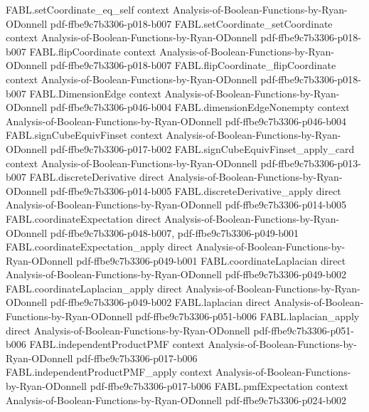 \begin{theorem}
  {FABL.setCoordinate_eq_self}
  {context}
  {Analysis-of-Boolean-Functions-by-Ryan-ODonnell}
  {pdf-ffbe9c7b3306-p018-b007}
\proofstep
  {FABL.setCoordinate_setCoordinate}
  {context}
  {Analysis-of-Boolean-Functions-by-Ryan-ODonnell}
  {pdf-ffbe9c7b3306-p018-b007}
\proofstep
  {FABL.flipCoordinate}
  {context}
  {Analysis-of-Boolean-Functions-by-Ryan-ODonnell}
  {pdf-ffbe9c7b3306-p018-b007}
\proofstep
  {FABL.flipCoordinate_flipCoordinate}
  {context}
  {Analysis-of-Boolean-Functions-by-Ryan-ODonnell}
  {pdf-ffbe9c7b3306-p018-b007}
\proofstep
  {FABL.DimensionEdge}
  {context}
  {Analysis-of-Boolean-Functions-by-Ryan-ODonnell}
  {pdf-ffbe9c7b3306-p046-b004}
\proofstep
  {FABL.dimensionEdgeNonempty}
  {context}
  {Analysis-of-Boolean-Functions-by-Ryan-ODonnell}
  {pdf-ffbe9c7b3306-p046-b004}
\proofstep
  {FABL.signCubeEquivFinset}
  {context}
  {Analysis-of-Boolean-Functions-by-Ryan-ODonnell}
  {pdf-ffbe9c7b3306-p017-b002}
\proofstep
  {FABL.signCubeEquivFinset_apply_card}
  {context}
  {Analysis-of-Boolean-Functions-by-Ryan-ODonnell}
  {pdf-ffbe9c7b3306-p013-b007}
\proofstep
  {FABL.discreteDerivative}
  {direct}
  {Analysis-of-Boolean-Functions-by-Ryan-ODonnell}
  {pdf-ffbe9c7b3306-p014-b005}
\proofstep
  {FABL.discreteDerivative_apply}
  {direct}
  {Analysis-of-Boolean-Functions-by-Ryan-ODonnell}
  {pdf-ffbe9c7b3306-p014-b005}
\proofstep
  {FABL.coordinateExpectation}
  {direct}
  {Analysis-of-Boolean-Functions-by-Ryan-ODonnell}
  {pdf-ffbe9c7b3306-p048-b007,
    pdf-ffbe9c7b3306-p049-b001}
\proofstep
  {FABL.coordinateExpectation_apply}
  {direct}
  {Analysis-of-Boolean-Functions-by-Ryan-ODonnell}
  {pdf-ffbe9c7b3306-p049-b001}
\proofstep
  {FABL.coordinateLaplacian}
  {direct}
  {Analysis-of-Boolean-Functions-by-Ryan-ODonnell}
  {pdf-ffbe9c7b3306-p049-b002}
\proofstep
  {FABL.coordinateLaplacian_apply}
  {direct}
  {Analysis-of-Boolean-Functions-by-Ryan-ODonnell}
  {pdf-ffbe9c7b3306-p049-b002}
\proofstep
  {FABL.laplacian}
  {direct}
  {Analysis-of-Boolean-Functions-by-Ryan-ODonnell}
  {pdf-ffbe9c7b3306-p051-b006}
\proofstep
  {FABL.laplacian_apply}
  {direct}
  {Analysis-of-Boolean-Functions-by-Ryan-ODonnell}
  {pdf-ffbe9c7b3306-p051-b006}
\proofstep
  {FABL.independentProductPMF}
  {context}
  {Analysis-of-Boolean-Functions-by-Ryan-ODonnell}
  {pdf-ffbe9c7b3306-p017-b006}
\proofstep
  {FABL.independentProductPMF_apply}
  {context}
  {Analysis-of-Boolean-Functions-by-Ryan-ODonnell}
  {pdf-ffbe9c7b3306-p017-b006}
\proofstep
  {FABL.pmfExpectation}
  {context}
  {Analysis-of-Boolean-Functions-by-Ryan-ODonnell}
  {pdf-ffbe9c7b3306-p024-b002}
\proofstep

\end{theorem}
